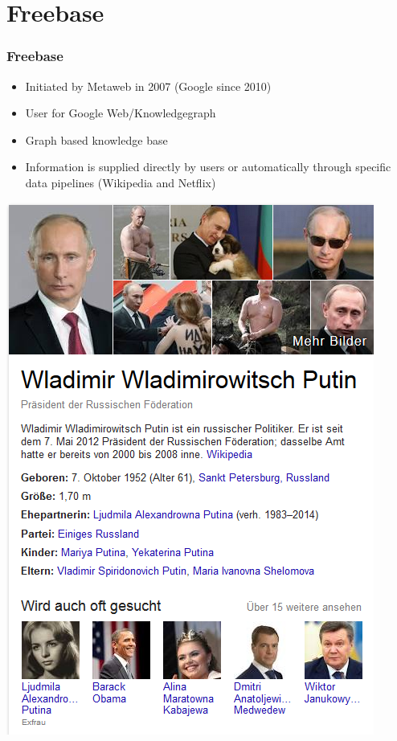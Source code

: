 \section{Freebase}

\begin{frame}
\frametitle{Freebase}

\begin{minipage}{0.55\textwidth}

\begin{itemize}
  \item Initiated by Metaweb in 2007 (Google since 2010)
  \item User for Google Web/Knowledgegraph
  \item Graph based knowledge base
  \item Information is supplied directly by users or automatically through
  specific data pipelines (Wikipedia and Netflix)
\end{itemize}
\end{minipage}
\hfill %
\begin{minipage}{0.35\textwidth}
\includegraphics[scale=0.25]{img/putin_freebase.png}
\end{minipage}
\end{frame}

